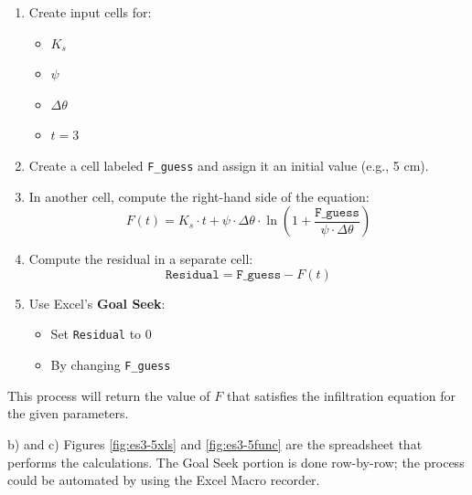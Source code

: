 \documentclass[12pt]{article}
\begin{document}
\begin{enumerate}
\begin{enumerate}
    \item Create input cells for:
    \begin{itemize}
        \item \( K_s \)
        \item \( \psi \)
        \item \( \Delta \theta \)
        \item \( t = 3 \)
    \end{itemize}
    \item Create a cell labeled \texttt{F\_guess} and assign it an initial value (e.g., 5 cm).
    \item In another cell, compute the right-hand side of the equation:
    \[
    F(t) = K_s \cdot t + \psi \cdot \Delta \theta \cdot \ln\left(1 + \frac{\texttt{F\_guess}}{\psi \cdot \Delta \theta} \right)
    \]
    \item Compute the residual in a separate cell:
    \[
    \texttt{Residual} = \texttt{F\_guess} - F(t)
    \]
    \item Use Excel's \textbf{Goal Seek}:
    \begin{itemize}
        \item Set \texttt{Residual} to 0
        \item By changing \texttt{F\_guess}
    \end{itemize}
\end{enumerate}

\noindent This process will return the value of \( F \) that satisfies the infiltration equation for the given parameters.

b) and c) Figures \ref{fig:es3-5xls} and \ref{fig:es3-5func} are the spreadsheet that performs the calculations.  The Goal Seek portion is done row-by-row; the process could be automated by using the Excel Macro recorder.


\end{enumerate}
\end{document}
